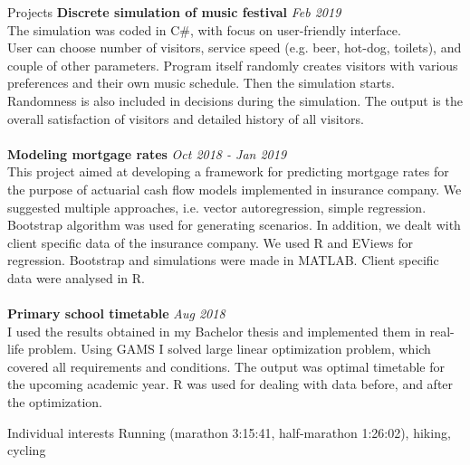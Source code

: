 \documentclass{resume} %
\begin{document}
\begin{rSection}{Projects}
{\bf Discrete simulation of music festival} \hfill {\em Feb 2019}\\
The simulation was coded in C\#, with focus on user-friendly interface.\\
User can choose number of visitors, service speed (e.g. beer, hot-dog, toilets), and couple of other parameters. Program itself randomly creates visitors with various preferences and their own music schedule. Then the simulation starts. Randomness is also included in decisions during the simulation. The output is the overall satisfaction of visitors and detailed history of all visitors.\\
\\{\bf Modeling mortgage rates} \hfill {\em Oct 2018 - Jan 2019}\\
This project aimed at developing a framework for predicting mortgage rates for the purpose of actuarial cash flow models implemented in insurance company. We suggested multiple approaches, i.e. vector autoregression, simple regression. Bootstrap algorithm was used for generating scenarios. In addition, we dealt with client specific data of the insurance company. We used R and EViews for regression. Bootstrap and simulations were made in MATLAB. Client specific data were analysed in R.\\
\\{\bf Primary school timetable} \hfill {\em Aug 2018}\\
I used the results obtained in my Bachelor thesis and implemented them in real-life problem. Using GAMS I solved large linear optimization problem, which covered all requirements and conditions. The output was optimal timetable for the upcoming academic year. R was used for dealing with data before, and after the optimization.
\end{rSection}

\begin{rSection}{Individual interests}
Running (marathon 3:15:41, half-marathon 1:26:02), hiking, cycling
\end{rSection}
\end{document}
